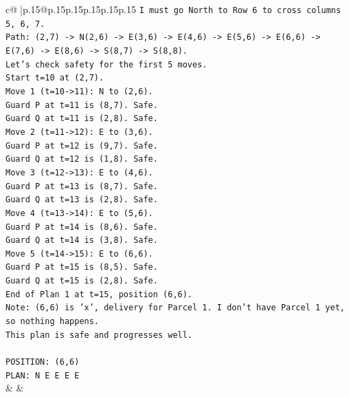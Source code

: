 \documentclass{article}
\begin{document}
{\begin{supertabular}{c@{$\;$}|p{.15\linewidth}@{}p{.15\linewidth}p{.15\linewidth}p{.15\linewidth}p{.15\linewidth}p{.15\linewidth}}
{{{\texttt{I must go North to Row 6 to cross columns 5, 6, 7.} \\
\texttt{Path: (2,7) {-}> N(2,6) {-}> E(3,6) {-}> E(4,6) {-}> E(5,6) {-}> E(6,6) {-}> E(7,6) {-}> E(8,6) {-}> S(8,7) {-}> S(8,8).} \\
\texttt{Let's check safety for the first 5 moves.} \\
\texttt{Start t=10 at (2,7).} \\
\texttt{Move 1 (t=10{-}>11): N to (2,6).} \\
\texttt{Guard P at t=11 is (8,7). Safe.} \\
\texttt{Guard Q at t=11 is (2,8). Safe.} \\
\texttt{Move 2 (t=11{-}>12): E to (3,6).} \\
\texttt{Guard P at t=12 is (9,7). Safe.} \\
\texttt{Guard Q at t=12 is (1,8). Safe.} \\
\texttt{Move 3 (t=12{-}>13): E to (4,6).} \\
\texttt{Guard P at t=13 is (8,7). Safe.} \\
\texttt{Guard Q at t=13 is (2,8). Safe.} \\
\texttt{Move 4 (t=13{-}>14): E to (5,6).} \\
\texttt{Guard P at t=14 is (8,6). Safe.} \\
\texttt{Guard Q at t=14 is (3,8). Safe.} \\
\texttt{Move 5 (t=14{-}>15): E to (6,6).} \\
\texttt{Guard P at t=15 is (8,5). Safe.} \\
\texttt{Guard Q at t=15 is (2,8). Safe.} \\
\texttt{End of Plan 1 at t=15, position (6,6).} \\
\texttt{Note: (6,6) is 'x', delivery for Parcel 1. I don't have Parcel 1 yet, so nothing happens.} \\
\texttt{This plan is safe and progresses well.} \\
\\ 
\texttt{POSITION: (6,6)} \\
\texttt{PLAN: N E E E E} \\
            }
        }
    }
    & & \\ \\


\end{supertabular}}
\end{document}
